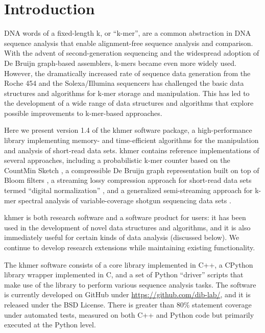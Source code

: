 \documentclass[10pt,a4paper,twocolumn]{article}
\begin{document}
\section*{Introduction}


DNA words of a fixed-length k, or ``k-mer'', are a common abstraction
in DNA sequence analysis that enable alignment-free sequence analysis
and comparison. With the advent of second-generation
sequencing and the widespread adoption of De Bruijn graph-based
assemblers, k-mers became even more widely used.  However, the
dramatically increased rate of sequence data generation from the Roche
454 and the Solexa/Illumina sequencers has challenged the basic
data structures and algorithms for k-mer storage and manipulation.
This has led to the development of a wide range of data structures and
algorithms that explore possible improvements to k-mer-based
approaches.

Here we present version 1.4 of the khmer software package, a
high-performance library implementing memory- and time-efficient
algorithms for the manipulation and analysis of short-read data sets.  khmer
contains reference implementations of several approaches, including a
probabilistic k-mer counter based on the CountMin Sketch \cite{Zhang2013}, a
compressible De Bruijn graph representation built on top of Bloom
filters \cite{Pell2012}, a streaming lossy compression approach for
short-read data sets termed ``digital normalization'' \cite{Brown2012},
and a generalized semi-streaming approach for k-mer spectral analysis of
variable-coverage shotgun sequencing data sets \cite{zhang2015crossing}.

khmer is both research software and a software product for users: it
has been used in the development of novel data structures and
algorithms, and it is also immediately useful for certain kinds of
data analysis (discussed below).  We continue to develop research
extensions while maintaining existing functionality.

The khmer software consists of a core library implemented in C++, a
CPython library wrapper implemented in C, and a set of Python
``driver'' scripts that make use of the library to perform various
sequence analysis tasks.  The software is currently developed on
GitHub under \url{https://github.com/dib-lab/}, and it is released under the BSD
License.  There is greater than 80\% statement coverage under
automated tests, measured on both C++ and Python code but primarily
executed at the Python level.
\end{document}
